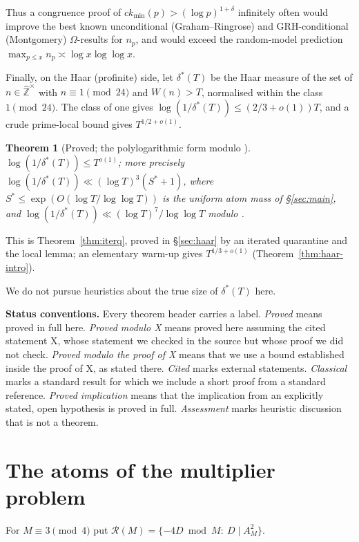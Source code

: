 \documentclass[11pt,reqno]{amsart}
\newtheorem{theorem}{Theorem}[section]
\theoremstyle{definition}
\newcommand{\cR}{\mathcal R}
\newcommand{\ckmin}{ck_{\min}}
\begin{document}
Thus a congruence proof of $\ckmin(p)>(\log p)^{1+\delta}$ infinitely often
would improve the best known unconditional (Graham--Ringrose) and
GRH-conditional (Montgomery) $\Omega$-results for $n_p$, and would exceed the
random-model prediction $\max_{p\le x}n_p\asymp\log x\log\log x$.

Finally, on the Haar (profinite) side, let $\delta^*(T)$ be the Haar measure
of the set of $n\in\widehat{\mathbb Z}^\times$ with $n\equiv1\pmod{24}$ and
$W(n)>T$, normalised within the class $1\pmod{24}$.  The class of one gives
$\log(1/\delta^*(T))\le(2/3+o(1))T$, and a crude prime-local bound gives
$T^{1/2+o(1)}$.

\begin{theorem}[Proved; the polylogarithmic form modulo {\cite[Prop.~1.4]{ET}}]\label{thm:haar-main}
$\log(1/\delta^*(T))\le T^{o(1)}$; more precisely
$\log(1/\delta^*(T))\ll(\log T)^3(S^*+1)$, where $S^*\le\exp(O(\log T/\log\log T))$ is the
uniform atom mass of \S\ref{sec:main},
and $\log(1/\delta^*(T))\ll(\log T)^7/\log\log T$ modulo \cite[Prop.~1.4]{ET}.
\end{theorem}

This is Theorem~\ref{thm:iterq}, proved in \S\ref{sec:haar} by an iterated
quarantine and the local lemma; an elementary warm-up gives
$T^{1/3+o(1)}$ (Theorem~\ref{thm:haar-intro}).

We do not pursue heuristics about the true size of $\delta^*(T)$ here.

\smallskip\noindent\textbf{Status conventions.}  Every theorem header
carries a label.  \emph{Proved} means proved in full here.
\emph{Proved modulo X} means proved here assuming the cited statement X,
whose statement we checked in the source but whose proof we did not check.
\emph{Proved modulo the proof of X} means that we use a bound established
inside the proof of X, as stated there.  \emph{Cited} marks external statements.
\emph{Classical} marks a standard result for which we include a short proof
from a standard reference.  \emph{Proved implication} means that the
implication from an explicitly stated, open hypothesis is proved in full.
\emph{Assessment} marks heuristic discussion that is not a theorem.

\section{The atoms of the multiplier problem}\label{sec:atoms}

For $M\equiv3\pmod4$ put $\cR(M)=\{-4D\bmod M:\ D\mid A_M^2\}$.
\end{document}
